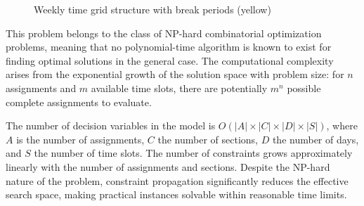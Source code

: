 \documentclass[12pt,a4paper]{article}
\begin{document}
\begin{figure}[H]
\centering
{}
\caption{Weekly time grid structure with break periods (yellow)}
\label{fig:timegrid}
\end{figure}

This problem belongs to the class of NP-hard combinatorial optimization problems, meaning that no polynomial-time algorithm is known to exist for finding optimal solutions in the general case. The computational complexity arises from the exponential growth of the solution space with problem size: for $n$ assignments and $m$ available time slots, there are potentially $m^n$ possible complete assignments to evaluate.

The number of decision variables in the model is $O(|A| \times |C| \times |D| \times |S|)$, where $A$ is the number of assignments, $C$ the number of sections, $D$ the number of days, and $S$ the number of time slots. The number of constraints grows approximately linearly with the number of assignments and sections. Despite the NP-hard nature of the problem, constraint propagation significantly reduces the effective search space, making practical instances solvable within reasonable time limits.
\end{document}
